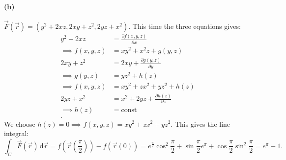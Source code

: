 \paragraph{(b)} $\Vec{F}\left( \Vec{r} \right) = \left( y^2 + 2xz, 2xy + z^2, 2yz + x^2 \right) $.
\bigbreak
This time the three equations gives:
\begin{align*}
  y^2 + 2xz &= \frac{\partial f(x,y,z)}{\partial x} \\
  \implies f(x,y,z) &= xy^2 + x^2z + g(y,z) \\
  2xy + z^2 &= 2xy + \frac{\partial g(y,z)}{\partial y} \\
  \implies g(y,z) &= yz^2 + h(z) \\
  \implies f(x,y,z) &= xy^2 + zx^2 + yz^2 + h(z) \\
  2yz + x^2 &= x^2 + 2yz + \frac{\partial h(z)}{\partial z} \\
  \implies h(z) &= \mathrm{const} \\
.\end{align*}
We choose $h(z) = 0 \implies f(x,y,z) = xy^2 + zx^2 + yz^2$. This gives the line integral:
\[ 
\int_{C} \Vec{F} \left( \Vec{r} \right) \, \mathrm{d}\Vec{r} = f \left( \Vec{r} \left( \frac{\pi}{2} \right) \right) - f \left( \Vec{r}(0) \right) = e^{\frac{\pi}{2}} \cos^2 \frac{\pi}{2} + \sin \frac{\pi}{2} e^{\pi} + \cos \frac{\pi}{2} \sin^2 \frac{\pi}{2} = e^{\pi} - 1
.\]

